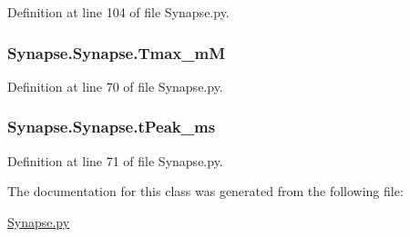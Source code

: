 Definition at line 104 of file Synapse.\-py.

\hypertarget{class_synapse_1_1_synapse_ae4bcd698c5be77c2a6629d511d75f046}{
\subsubsection[{Tmax\-\_\-m\-M}]{\setlength{\rightskip}{0pt plus 5cm}Synapse.\-Synapse.\-Tmax\-\_\-m\-M}}\label{class_synapse_1_1_synapse_ae4bcd698c5be77c2a6629d511d75f046}


Definition at line 70 of file Synapse.\-py.

\hypertarget{class_synapse_1_1_synapse_a09b9b092efcb0d6745fa32fadcd46375}{
\subsubsection[{t\-Peak\-\_\-ms}]{\setlength{\rightskip}{0pt plus 5cm}Synapse.\-Synapse.\-t\-Peak\-\_\-ms}}\label{class_synapse_1_1_synapse_a09b9b092efcb0d6745fa32fadcd46375}


Definition at line 71 of file Synapse.\-py.



The documentation for this class was generated from the following file\-:\begin{DoxyCompactItemize}
\item 
\hyperlink{_synapse_8py}{Synapse.\-py}\end{DoxyCompactItemize}
